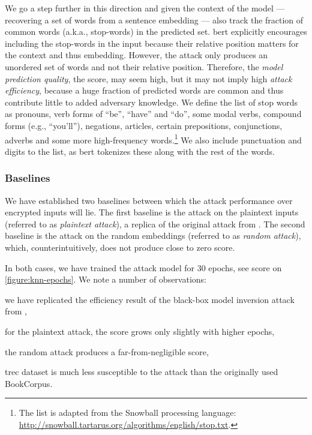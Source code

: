 				We go a step further in this direction and given the context of the model --- recovering a set of words from a sentence embedding --- also track the fraction of common words (a.k.a., stop-words) in the predicted set.
				\acrshort{bert} explicitly encourages including the stop-words in the input because their relative position matters for the context and thus embedding.
				However, the attack only produces an unordered set of words and not their relative position.
				Therefore, the \emph{model prediction quality}, the \FOne{} score, may seem high, but it may not imply high \emph{attack efficiency}, because a huge fraction of predicted words are common and thus contribute little to added adversary knowledge.
				We define the list of stop words as pronouns, verb forms of ``be'', ``have'' and ``do'', some modal verbs, compound forms (e.g., ``you'll''), negations, articles, certain prepositions, conjunctions, adverbs and some more high-frequency words.\footnote{
					The list is adapted from the Snowball processing language: \url{http://snowball.tartarus.org/algorithms/english/stop.txt}.
				}
				We also include punctuation and digits to the list, as \acrshort{bert} tokenizes these along with the rest of the words.

			\subsubsection{Baselines}\label{section:knn-snapshot:attacks:experiments:baselines}

				

				We have established two baselines between which the attack performance over encrypted inputs will lie.
				The first baseline is the attack on the plaintext inputs (referred to as \emph{plaintext attack}), a replica of the original attack from \cite{embedding-attacks}.
				The second baseline is the attack on the random embeddings (referred to as \emph{random attack}), which, counterintuitively, does not produce close to zero \FOne{} score.

				In both cases, we have trained the attack model for 30 epochs, see \FOne{} score on \cref{figure:knn-epochs}.
				We note a number of observations:
				\begin{enumerate*}[label={(\roman*)}]
					\item we have replicated the efficiency result of the black-box model inversion attack from \cite[Table 2, \FOne{} score, same domain, $\mathcal{L}_{\text{\acrshort{msp}}}$, \acrshort{bert}]{embedding-attacks},
					\item for the plaintext attack, the \FOne{} score grows only slightly with higher epochs,
					\item the random attack produces a far-from-negligible \FOne{} score,
					\item \acrshort{trec} dataset is much less susceptible to the attack than the originally used BookCorpus.
				\end{enumerate*}

